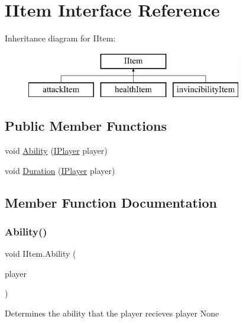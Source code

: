 \hypertarget{interface_i_item}{}\section{I\+Item Interface Reference}
\label{interface_i_item}
Inheritance diagram for I\+Item\+:\begin{figure}[H]
\begin{center}
\leavevmode
\includegraphics[height=2.000000cm]{interface_i_item}
\end{center}
\end{figure}
\subsection*{Public Member Functions}
\begin{DoxyCompactItemize}
\item 
void \mbox{\hyperlink{interface_i_item_afe73efbf8316273df20162d6f4b20648}{Ability}} (\mbox{\hyperlink{class_i_player}{I\+Player}} player)
\item 
void \mbox{\hyperlink{interface_i_item_a797c1d62a7828bf428cc486ceaf18e9c}{Duration}} (\mbox{\hyperlink{class_i_player}{I\+Player}} player)
\end{DoxyCompactItemize}


\subsection{Member Function Documentation}
\mbox{\label{interface_i_item_afe73efbf8316273df20162d6f4b20648}} 
\subsubsection{\texorpdfstring{Ability()}{Ability()}}
{\footnotesize\ttfamily void I\+Item.\+Ability (\begin{DoxyParamCaption}\item[{\mbox{\hyperlink{class_i_player}{I\+Player}}}]{player }\end{DoxyParamCaption})}

Determines the ability that the player recieves  player  None 

